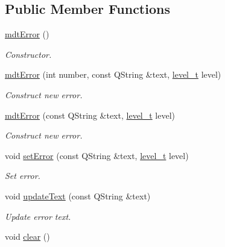 \subsection*{Public Member Functions}
\begin{DoxyCompactItemize}
\item 
\hypertarget{classmdt_error_a78824dc8c0029107949baaf28c4a9df5}{
\hyperlink{classmdt_error_a78824dc8c0029107949baaf28c4a9df5}{mdtError} ()}
\label{classmdt_error_a78824dc8c0029107949baaf28c4a9df5}

\begin{DoxyCompactList}\small\item\em Constructor. \end{DoxyCompactList}\item 
\hyperlink{classmdt_error_a377c175cc8e1aeae543cae2ecc5ca87b}{mdtError} (int number, const QString \&text, \hyperlink{classmdt_error_a5c8b1a040e2feaa848f6201d6b6f0cd7}{level\_\-t} level)
\begin{DoxyCompactList}\small\item\em Construct new error. \end{DoxyCompactList}\item 
\hypertarget{classmdt_error_a775542a251ef746f3433e7d790a48d85}{
\hyperlink{classmdt_error_a775542a251ef746f3433e7d790a48d85}{mdtError} (const QString \&text, \hyperlink{classmdt_error_a5c8b1a040e2feaa848f6201d6b6f0cd7}{level\_\-t} level)}
\label{classmdt_error_a775542a251ef746f3433e7d790a48d85}

\begin{DoxyCompactList}\small\item\em Construct new error. \end{DoxyCompactList}\item 
void \hyperlink{classmdt_error_a8e7961a665841c1b052116e4dd2eb855}{setError} (const QString \&text, \hyperlink{classmdt_error_a5c8b1a040e2feaa848f6201d6b6f0cd7}{level\_\-t} level)
\begin{DoxyCompactList}\small\item\em Set error. \end{DoxyCompactList}\item 
void \hyperlink{classmdt_error_ace38a9600c19ddf3628d46b1a6a7b414}{updateText} (const QString \&text)
\begin{DoxyCompactList}\small\item\em Update error text. \end{DoxyCompactList}\item 
\hypertarget{classmdt_error_a9fa7eb879fe7b26c4a4f0bd55fe29ffa}{
void \hyperlink{classmdt_error_a9fa7eb879fe7b26c4a4f0bd55fe29ffa}{clear} ()}
\label{classmdt_error_a9fa7eb879fe7b26c4a4f0bd55fe29ffa}


\end{DoxyCompactItemize}
